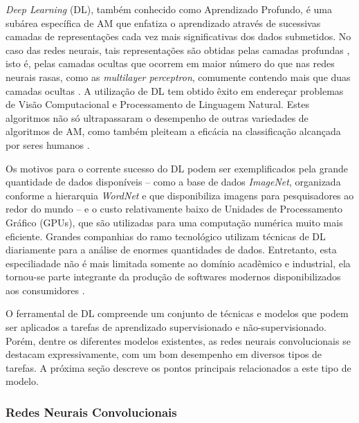 
\emph{Deep Learning} (DL), também conhecido como Aprendizado Profundo, é uma subárea específica de AM que enfatiza o aprendizado através de sucessivas camadas de representações cada vez mais significativas dos dados submetidos. No caso das redes neurais, tais representações são obtidas pelas camadas profundas \cite{chollet}, isto é, pelas camadas ocultas que ocorrem em maior número do que nas redes neurais rasas, como as \emph{multilayer perceptron}, comumente contendo mais que duas camadas ocultas \cite{heaton}. A utilização de DL tem obtido êxito em endereçar problemas de Visão Computacional e Processamento de Linguagem Natural. Estes algoritmos não só ultrapassaram o desempenho de outras variedades de algoritmos de AM, como também pleiteam a eficácia na classificação alcançada por seres humanos \cite{buduma}.

Os motivos para o corrente sucesso do DL podem ser exemplificados pela grande quantidade de dados disponíveis -- como a base de dados \emph{ImageNet}, organizada conforme a hierarquia \emph{WordNet} e que disponibiliza imagens para pesquisadores ao redor do mundo \cite{imagenet} -- e o custo relativamente baixo de Unidades de Processamento Gráfico (GPUs), que são utilizadas para uma computação numérica muito mais eficiente. Grandes companhias do ramo tecnológico utilizam técnicas de DL diariamente para a análise de enormes quantidades de dados. Entretanto, esta especiliadade não é mais limitada somente ao domínio acadêmico e industrial, ela tornou-se parte integrante da produção de softwares modernos disponibilizados aos consumidores \cite{gulli}.


O ferramental de DL compreende um conjunto de técnicas e modelos que podem ser aplicados a tarefas de aprendizado supervisionado e não-supervisionado. Porém, dentre os diferentes modelos existentes, as redes neurais convolucionais se destacam expressivamente, com um bom desempenho em diversos tipos de tarefas. A próxima seção descreve os pontos principais relacionados a este tipo de modelo.

\subsubsection{Redes Neurais Convolucionais}
\label{subsubsec:cnns}

